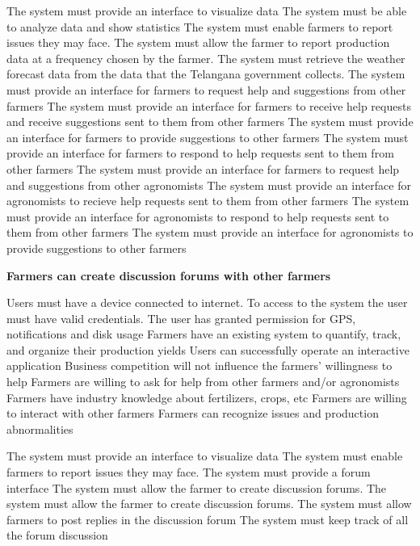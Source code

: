 \begin{itemize}
\begin{itemize}
 The system must provide an interface to visualize data
 The system must be able to analyze data and show statistics
 The system must enable farmers to report issues they may face.
 The system must allow the farmer to report production data at a frequency chosen by the farmer.
 The system must retrieve the weather forecast data from the data that the Telangana government collects.
 The system must provide an interface for farmers to request help and suggestions from other farmers
 The system must provide an interface for farmers to receive help requests and receive suggestions sent to them from other farmers
 The system must provide an interface for farmers to provide suggestions to other farmers
 The system must provide an interface for farmers to respond to help requests sent to them from other farmers
 The system must provide an interface for farmers to request help and suggestions from other agronomists
 The system must provide an interface for agronomists to recieve help requests sent to them from other farmers
 The system must provide an interface for agronomists to respond to help requests sent to them from other farmers 
 The system must provide an interface for agronomists to provide suggestions to other farmers
\end{itemize}

 \textbf{Farmers can create discussion forums with other farmers}
\begin{itemize}
  Users must have a device connected to internet.
 To access to the system the user must have valid credentials.
 The user has granted permission for GPS, notifications and disk usage
 Farmers have an existing system to quantify, track, and organize their production yields
 Users can successfully operate an interactive application
 Business competition will not influence the farmers' willingness to help
 Farmers are willing to ask for help from other farmers and/or agronomists
 Farmers have industry knowledge about fertilizers, crops, etc 
 Farmers are willing to interact with other farmers 
 Farmers can recognize issues and production abnormalities


 The system must provide an interface to visualize data
 The system must enable farmers to report issues they may face.
  The system must provide a forum interface
  The system must allow the farmer to create discussion forums.
  The system must allow the farmer to create discussion forums.
  The system must allow farmers to post replies in the discussion forum
  The system must keep track of all the forum discussion
\end{itemize}


\end{itemize}
